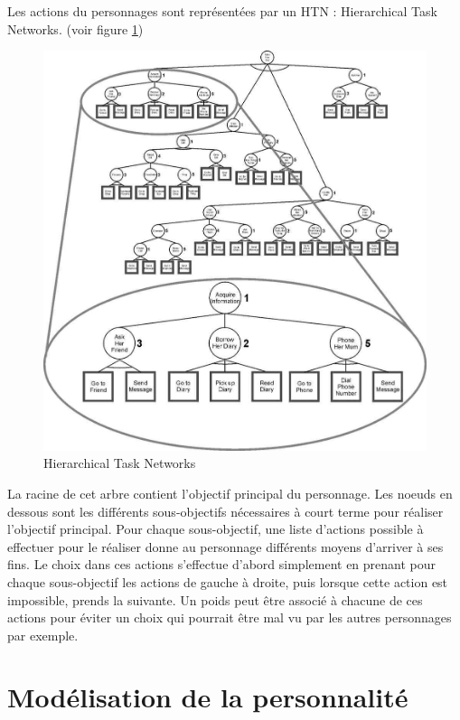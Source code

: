 \documentclass[asi]{picINSA}
\begin{document}
Les actions du personnages sont représentées par un HTN : Hierarchical Task Networks. (voir figure \ref{fig:htn})\\
\begin{figure}[h!]
  \centering
  \includegraphics[scale=0.4]{images/htn.png}
  \caption{Hierarchical Task Networks}
  \label{fig:htn}
\end{figure}

La racine de cet arbre contient l'objectif principal du personnage. Les noeuds en dessous sont les différents sous-objectifs nécessaires à court terme pour réaliser l'objectif principal. Pour chaque sous-objectif, une liste d'actions possible à effectuer pour le réaliser donne au personnage différents moyens d'arriver à ses fins. Le choix dans ces actions s'effectue d'abord simplement en prenant pour chaque sous-objectif les actions de gauche à droite, puis lorsque cette action est impossible, prends la suivante. Un poids peut être associé à chacune de ces actions pour éviter un choix qui pourrait être mal vu par les autres personnages par exemple.\\


\section{Modélisation de la personnalité}
\end{document}

